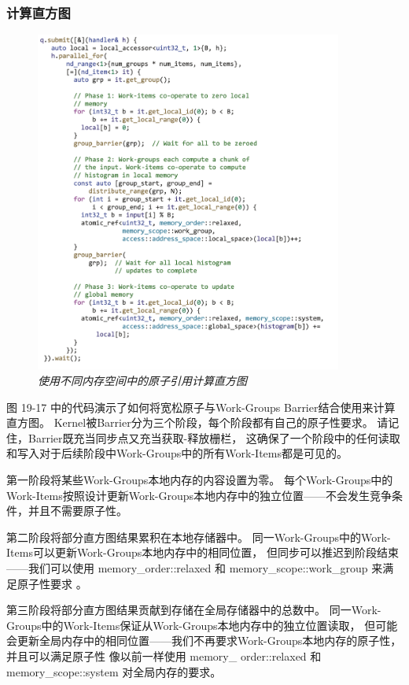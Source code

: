 \subsubsection{计算直方图}
\begin{figure}[H]
	\centering
	\includegraphics[width=0.9\textwidth]{figs/F19.17.png}
	\caption{\textit{使用不同内存空间中的原子引用计算直方图 }}
\end{figure}

图 19-17 中的代码演示了如何将宽松原子与Work-Groups Barrier结合使用来计算直方图。 
Kernel被Barrier分为三个阶段，每个阶段都有自己的原子性要求。 
请记住，Barrier既充当同步点又充当获取-释放栅栏，
这确保了一个阶段中的任何读取和写入对于后续阶段中Work-Groups中的所有Work-Items都是可见的。

第一阶段将某些Work-Groups本地内存的内容设置为零。 
每个Work-Groups中的Work-Items按照设计更新Work-Groups本地内存中的独立位置——不会发生竞争条件，并且不需要原子性。

第二阶段将部分直方图结果累积在本地存储器中。 
同一Work-Groups中的Work-Items可以更新Work-Groups本地内存中的相同位置，
但同步可以推迟到阶段结束——我们可以使用 memory\_order::relaxed 
和 memory\_scope::work\_group 来满足原子性要求 。

第三阶段将部分直方图结果贡献到存储在全局存储器中的总数中。 
同一Work-Groups中的Work-Items保证从Work-Groups本地内存中的独立位置读取，
但可能会更新全局内存中的相同位置——我们不再要求Work-Groups本地内存的原子性，
并且可以满足原子性 像以前一样使用 memory\_ order::relaxed 和 memory\_scope::system 对全局内存的要求。

